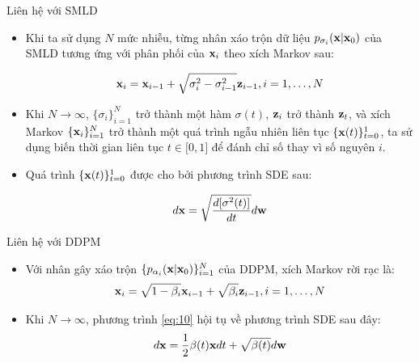 \documentclass[10pt]{beamer}
\theoremstyle{remark}
\numberwithin{algocf}{section}
\numberwithin{equation}{section}
\numberwithin{dl}{section}
\numberwithin{figure}{section}
\begin{document}
\begin{frame}{Liên hệ với SMLD}
	\begin{itemize}
		\item Khi ta sử dụng $N$ mức nhiễu, từng nhân xáo trộn dữ liệu $p_{\sigma_i}(\bold{x} \vert \bold{x}_0)$ của SMLD tương ứng với phân phối của $\bold{x}_i$ theo xích Markov sau:

		\begin{equation}
		    \bold{x}_i = \bold{x}_{i-1} + \sqrt{\sigma_i^2 - \sigma_{i-1}^2} \bold{z}_{i-1}, i=1, \dots, N
		\end{equation}
		\item Khi $N \rightarrow \infty$, $\lbrace \sigma_i \rbrace_{i=1}^N$ trở thành một hàm $\sigma(t)$, $\bold{z}_i$ trở thành $\bold{z}_t$, và xích Markov $\lbrace \bold{x}_i \rbrace_{i=1}^N$ trở thành một quá trình ngẫu nhiên liên tục $\lbrace \bold{x}(t) \rbrace_{t=0}^1$, ta sử dụng biến thời gian liên tục $t \in \lbrack 0, 1 \rbrack$ để đánh chỉ số thay vì số nguyên $i$.
		\item Quá trình $\lbrace \bold{x}(t) \rbrace_{t=0}^1$ được cho bởi phương trình SDE sau:

		\begin{equation} \label{eq:9}
			d \bold{x} = \sqrt{\dfrac{d \lbrack \sigma^2(t) \rbrack}{dt}} d \bold{w}
		\end{equation}
	\end{itemize}
\end{frame}

\begin{frame}{Liên hệ với DDPM}
	\begin{itemize}
		\item Với nhân gây xáo trộn $\lbrace p_{\alpha_i} (\bold{x} \vert \bold{x}_0) \rbrace_{i=1}^N$ của DDPM, xích Markov rời rạc là:
		\begin{equation} \label{eq:10}
			\bold{x}_i = \sqrt{1 - \beta_i} \bold{x}_{i-1} + \sqrt{\beta_i} \bold{z}_{i-1}, i=1,\dots,N
		\end{equation}
		\item Khi $N \rightarrow \infty$, phương trình \ref{eq:10} hội tụ về phương trình SDE sau đây:
		\begin{equation} \label{eq:11}
			d \bold{x} = \dfrac{1}{2} \beta(t) \bold{x} dt + \sqrt{\beta(t)} d\bold{w}
		\end{equation}
	\end{itemize}
\end{frame}
\end{document}
